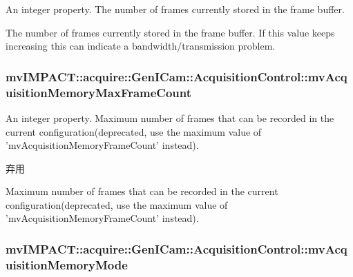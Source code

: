 An integer property. The number of frames currently stored in the frame buffer. 

The number of frames currently stored in the frame buffer. If this value keeps increasing this can indicate a bandwidth/transmission problem. \hypertarget{classmv_i_m_p_a_c_t_1_1acquire_1_1_gen_i_cam_1_1_acquisition_control_a364974f28a1daca359f60d451609adc8}{
\subsubsection[{mv\+Acquisition\+Memory\+Max\+Frame\+Count}]{ mv\+I\+M\+P\+A\+C\+T\+::acquire\+::\+Gen\+I\+Cam\+::\+Acquisition\+Control\+::mv\+Acquisition\+Memory\+Max\+Frame\+Count}}\label{classmv_i_m_p_a_c_t_1_1acquire_1_1_gen_i_cam_1_1_acquisition_control_a364974f28a1daca359f60d451609adc8}


An integer property. Maximum number of frames that can be recorded in the current configuration(deprecated, use the maximum value of 'mv\+Acquisition\+Memory\+Frame\+Count' instead). 

\begin{DoxyRefDesc}{弃用}
\item[\hyperlink{deprecated__deprecated000047}{弃用}]Maximum number of frames that can be recorded in the current configuration(deprecated, use the maximum value of 'mv\+Acquisition\+Memory\+Frame\+Count' instead). \end{DoxyRefDesc}
\hypertarget{classmv_i_m_p_a_c_t_1_1acquire_1_1_gen_i_cam_1_1_acquisition_control_a39dd9c3cc5099fe271ca00fb96faf949}{
\subsubsection[{mv\+Acquisition\+Memory\+Mode}]{ mv\+I\+M\+P\+A\+C\+T\+::acquire\+::\+Gen\+I\+Cam\+::\+Acquisition\+Control\+::mv\+Acquisition\+Memory\+Mode}}\label{classmv_i_m_p_a_c_t_1_1acquire_1_1_gen_i_cam_1_1_acquisition_control_a39dd9c3cc5099fe271ca00fb96faf949}


